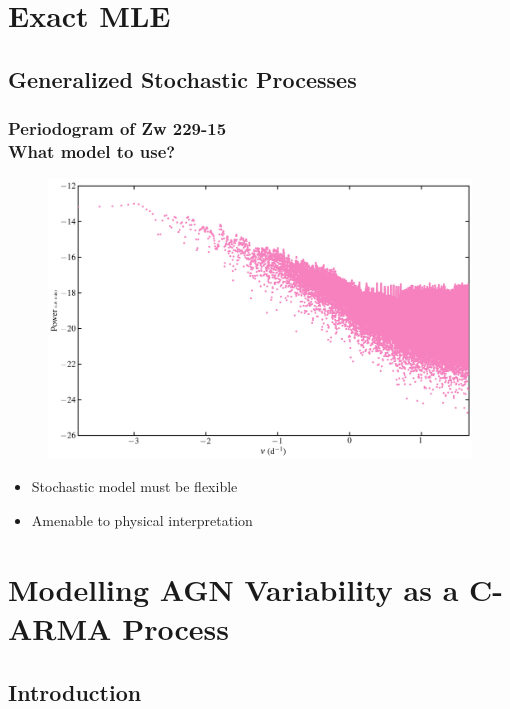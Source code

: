 \documentclass[hyperref={pdfpagelabels=false}]{beamer}
\begin{document}
\section{Exact MLE}

\subsection{Generalized Stochastic Processes}

\begin{frame}
\frametitle{Periodogram of Zw 229-15\\What model to use?}
  \begin{figure}
    \includegraphics[scale=0.05]{images/Periodogram.jpg}
  \end{figure}
  \begin{center}
    \centering
    \begin{itemize}
      \item Stochastic model must be flexible
      \item Amenable to physical interpretation
    \end{itemize}
  \end{center}
\end{frame}


\section{Modelling AGN Variability as a C-ARMA Process}

\subsection{Introduction}
\end{document}
